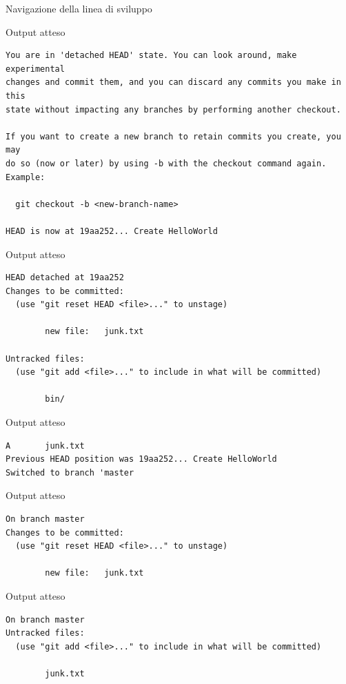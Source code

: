 \documentclass[presentation]{beamer}
\begin{document}
\begin{frame}{Navigazione della linea di sviluppo}
\begin{block}{Output atteso}
\begin{Verbatim}[fontsize=\scriptsize]
You are in 'detached HEAD' state. You can look around, make experimental
changes and commit them, and you can discard any commits you make in this
state without impacting any branches by performing another checkout.

If you want to create a new branch to retain commits you create, you may
do so (now or later) by using -b with the checkout command again. Example:

  git checkout -b <new-branch-name>

HEAD is now at 19aa252... Create HelloWorld
		\end{Verbatim}
	\end{block}
	\begin{block}{Output atteso}
		\begin{Verbatim}[fontsize=\scriptsize]
HEAD detached at 19aa252
Changes to be committed:
  (use "git reset HEAD <file>..." to unstage)

        new file:   junk.txt

Untracked files:
  (use "git add <file>..." to include in what will be committed)

        bin/

		\end{Verbatim}
	\end{block}
	\begin{block}{Output atteso}
		\begin{Verbatim}[fontsize=\scriptsize]
A       junk.txt
Previous HEAD position was 19aa252... Create HelloWorld
Switched to branch 'master
		\end{Verbatim}
	\end{block}
	\begin{block}{Output atteso}
		\begin{Verbatim}[fontsize=\scriptsize]
On branch master
Changes to be committed:
  (use "git reset HEAD <file>..." to unstage)

        new file:   junk.txt

		\end{Verbatim}
	\end{block}
	\begin{block}{Output atteso}
		\begin{Verbatim}[fontsize=\scriptsize]
On branch master
Untracked files:
  (use "git add <file>..." to include in what will be committed)

        junk.txt


\end{Verbatim}
\end{block}
\end{frame}
\end{document}
